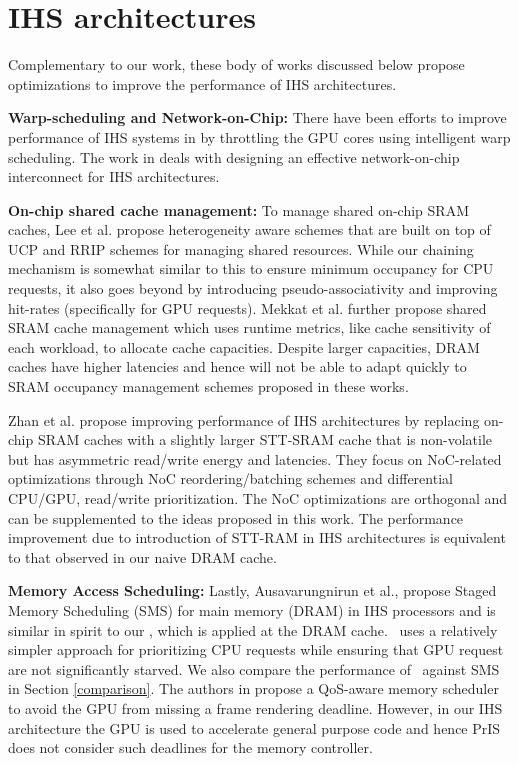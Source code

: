 \section{IHS architectures} \label{related-work-ihs-architecture}
Complementary to our work, these body of works discussed below propose optimizations to improve the performance of IHS architectures. 
\par \textbf{Warp-scheduling and Network-on-Chip:} There have been efforts to improve performance of IHS systems in \cite{gpu-concurrency} by throttling the GPU cores using intelligent warp scheduling. The work in \cite{interconnect} deals with designing an effective network-on-chip interconnect for IHS architectures. 
\par \textbf{On-chip shared cache management:} To manage shared on-chip SRAM caches, Lee et al. \cite{tap}  propose heterogeneity aware schemes that are built on top of UCP and RRIP schemes for managing shared resources. While our chaining mechanism is somewhat similar to this to ensure minimum occupancy for CPU requests, it also goes beyond by introducing pseudo-associativity and improving hit-rates (specifically for GPU requests). Mekkat et al. \cite{helm} further propose shared SRAM cache management which uses runtime metrics, like cache sensitivity of each workload, to allocate cache capacities. Despite larger capacities, DRAM caches have higher latencies and hence will not be able to adapt quickly to SRAM occupancy management schemes proposed in these works. 
\par Zhan et al. \cite{oscar} propose improving performance of IHS architectures by replacing on-chip SRAM caches with a slightly larger STT-SRAM cache that is non-volatile but has asymmetric read/write energy and latencies. They focus on NoC-related optimizations through NoC reordering/batching schemes and differential CPU/GPU, read/write prioritization. The NoC optimizations are orthogonal and can be supplemented to the ideas proposed in this work. The performance improvement due to introduction of STT-RAM in IHS architectures is equivalent to that observed in our naive DRAM cache.
\par \textbf{Memory Access Scheduling:} Lastly, Ausavarungnirun et al., \cite{sms} propose Staged Memory Scheduling (SMS) for main memory (DRAM) in IHS processors and is similar in spirit to our \prioname, which is applied at the DRAM cache. \prioname\ uses a relatively simpler approach for prioritizing CPU requests while ensuring that GPU request are not significantly starved. We also compare the performance of \cachename\ against SMS in Section \ref{comparison}. The authors in \cite{qos-aware} propose a QoS-aware memory scheduler to avoid the GPU from missing a frame rendering deadline. However, in our IHS architecture the GPU is used to accelerate general purpose code and hence PrIS does not consider such deadlines for the memory controller.
